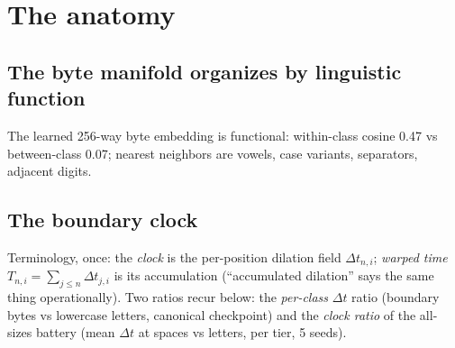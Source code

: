 \documentclass[11pt]{article}
\newcommand{\Dt}{\Delta t}
\begin{document}
\section{The anatomy}
\label{sec:anatomy}

\subsection{The byte manifold organizes by linguistic function}

The learned 256-way byte embedding is functional: within-class cosine
0.47 vs between-class 0.07; nearest neighbors are vowels, case variants,
separators, adjacent digits.

\subsection{The boundary clock}
\label{sec:clock}

Terminology, once: the \emph{clock} is the per-position dilation field
$\Dt_{n,i}$; \emph{warped time} $T_{n,i} = \sum_{j \le n} \Dt_{j,i}$ is
its accumulation (``accumulated dilation'' says the same thing
operationally). Two ratios recur below: the \emph{per-class} $\Dt$ ratio
(boundary bytes vs lowercase letters, canonical checkpoint) and the
\emph{clock ratio} of the all-sizes battery (mean $\Dt$ at spaces vs
letters, per tier, 5 seeds).
\end{document}
